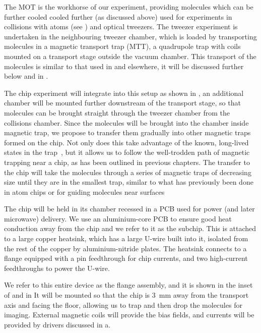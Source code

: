 The \CaF{} MOT is the workhorse of our experiment, providing molecules which
can be further cooled cooled further (as discussed above) used for experiments
in collisions with \Rb{} atoms (see ) and optical tweezers. The tweezer experiment is
undertaken in the neighbouring tweezer chamber, which is loaded by transporting
molecules in a magnetic transport trap (MTT), a quadrupole trap with coils
mounted on a transport stage outside the vacuum chamber. This transport of the
molecules is similar to that used in
 and elsewhere, it will be
discussed further below and in .

The chip experiment will integrate into this setup as shown in
, an additional chamber will be mounted
further downstream of the transport stage, so that molecules can be brought
straight through the tweezer chamber from the collisions chamber.  Since the
molecules will be brought into the chamber inside magnetic trap, we propose to
transfer them gradually into other magnetic traps formed on the chip.
%
Not only does this take advantage of the known, long-lived \CaF{} states in the
trap~\cite{WilliamsMagnetic2018}, but it allows us to follow the well-trodden
path of magnetic trapping near a chip, as has been outlined in previous
chapters.  The transfer to the chip will take the molecules through a series of
magnetic traps of decreasing size until they are in the smallest trap, similar
to what has previously been done in atom chips \cite{Reichel1999} or for
guiding molecules near surfaces \cite{Meek2009}

The chip will be held in its chamber recessed in a PCB used for power (and
later microwave) delivery. We use an aluminium-core PCB to ensure good heat
conduction away from the chip and we refer to it as the subchip.  This is
attached to a large copper heatsink, which has a large U-wire built into it,
isolated from the rest of the copper by aluminium-nitride plates. The heatsink
connects to a flange equipped with a  pin feedthrough for chip currents,
and two high-current feedthroughs to power the U-wire.

We refer to this entire device as the flange assembly, and it is shown in the
inset of  and in
 It will be mounted so that the chip is
\SI{3}{\milli\meter} away from the transport axis and facing the floor,
allowing us to trap and then drop the molecules for imaging.  External magnetic
coils will provide the bias fields, and currents will be provided by drivers
discussed in  {a}.

